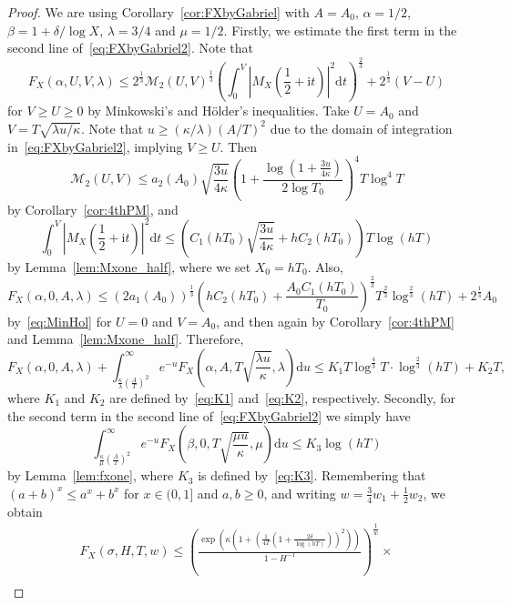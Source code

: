\documentclass[a4paper,reqno]{amsart}
\theoremstyle{definition}
\newcommand{\ie}[0]{\mathrm{i}}
\newcommand{\dif}[1]{\mathrm{d}#1}
\begin{document}
\begin{proof}
We are using Corollary~\ref{cor:FXbyGabriel} with $A=A_0$, $\alpha=1/2$, $\beta=1+\delta/\log{X}$, $\lambda=3/4$ and $\mu=1/2$. Firstly, we estimate the first term in the second line of~\eqref{eq:FXbyGabriel2}. Note that
\begin{equation}
\label{eq:MinHol}
F_{X}\left(\alpha,U,V,\lambda\right) \leq 2^{\frac{1}{3}}\mathcal{M}_{2}(U,V)^{\frac{1}{3}}\left(\int_{0}^{V}\left|M_{X}\left(\frac{1}{2}+\ie t\right)\right|^{2}\dif{t}\right)^{\frac{2}{3}} + 2^{\frac{1}{3}}(V-U)
\end{equation}
for $V\geq U\geq 0$ by Minkowski's and H\"{o}lder's inequalities. Take $U=A_0$ and $V=T\sqrt{\lambda u/\kappa}$. Note that $u\geq(\kappa/\lambda)(A/T)^2$ due to the domain of integration in~\eqref{eq:FXbyGabriel2}, implying $V\geq U$. Then
\[
\mathcal{M}_{2}(U,V) \leq a_2(A_0)\sqrt{\frac{3u}{4\kappa}}\left(1+\frac{\log{\left(1+\frac{3u}{4\kappa}\right)}}{2\log{T_0}}\right)^{4}T\log^{4}{T}
\]
by Corollary~\ref{cor:4thPM}, and
\[
\int_{0}^{V}\left|M_{X}\left(\frac{1}{2}+\ie t\right)\right|^{2}\dif{t}\leq \left(C_1(hT_0)\sqrt{\frac{3u}{4\kappa}}+hC_2(hT_0)\right)T\log{(hT)}
\]
by Lemma~\ref{lem:Mxone_half}, where we set $X_0=hT_0$. Also,
\[
F_{X}\left(\alpha,0,A,\lambda\right) \leq \left(2a_1(A_0)\right)^{\frac{1}{3}}\left(hC_2(hT_0)+\frac{A_0C_1(hT_0)}{T_0}\right)^{\frac{2}{3}}T^{\frac{2}{3}}\log^{\frac{2}{3}}{(hT)} + 2^{\frac{1}{3}}A_0
\]
by~\eqref{eq:MinHol} for $U=0$ and $V=A_0$, and then again by Corollary~\ref{cor:4thPM} and Lemma~\ref{lem:Mxone_half}. Therefore,
\[
F_{X}\left(\alpha,0,A,\lambda\right)+\int_{\frac{\kappa}{\lambda}\left(\frac{A}{T}\right)^2}^{\infty}e^{-u}F_{X}\left(\alpha,A,T\sqrt{\frac{\lambda u}{\kappa}},\lambda\right)\dif{u} \leq K_1T\log^{\frac{4}{3}}{T}\cdot\log^{\frac{2}{3}}{(hT)} + K_2T,
\]
where $K_1$ and $K_2$ are defined by~\eqref{eq:K1} and~\eqref{eq:K2}, respectively. Secondly, for the second term in the second line of~\eqref{eq:FXbyGabriel2} we simply have
\[
\int_{\frac{\kappa}{\mu}\left(\frac{A}{T}\right)^2}^{\infty}e^{-u}F_{X}\left(\beta,0,T\sqrt{\frac{\mu u}{\kappa}},\mu\right)\dif{u} \leq K_3\log(hT)
\]
by Lemma~\ref{lem:fxone}, where $K_3$ is defined by~\eqref{eq:K3}. Remembering that $(a+b)^{x}\leq a^{x}+b^{x}$ for $x\in(0,1]$ and $a,b\geq 0$, and writing $w=\frac{3}{4}w_{1}+\frac{1}{2}w_{2}$, we obtain
\begin{multline}
\label{eq:FXraw}
F_{X}\left(\sigma,H,T,w\right) \leq \left(\frac{\exp{\left(\kappa\left(1+\left(\frac{1}{4T}\left(1+\frac{2\delta}{\log{(hT)}}\right)\right)^{2}\right)\right)}}{1-H^{-1}}\right)^{\frac{1}{w}}\times \\

\end{multline}
\end{proof}
\end{document}
